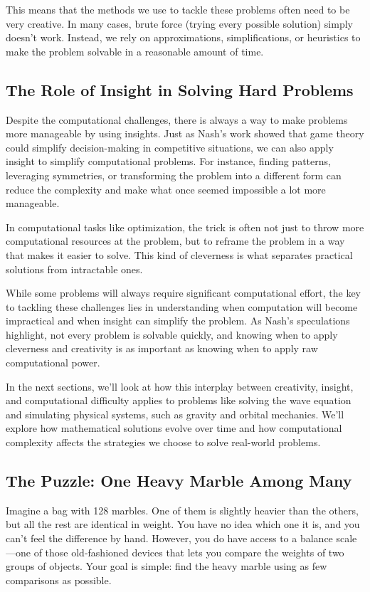 This means that the methods we use to tackle these problems often need to be very creative. In many cases, brute force (trying every possible solution) simply doesn’t work. Instead, we rely on approximations, simplifications, or heuristics to make the problem solvable in a reasonable amount of time.

\subsection{The Role of Insight in Solving Hard Problems}

Despite the computational challenges, there is always a way to make problems more manageable by using insights. Just as Nash’s work showed that game theory could simplify decision-making in competitive situations, we can also apply insight to simplify computational problems. For instance, finding patterns, leveraging symmetries, or transforming the problem into a different form can reduce the complexity and make what once seemed impossible a lot more manageable.

In computational tasks like optimization, the trick is often not just to throw more computational resources at the problem, but to reframe the problem in a way that makes it easier to solve. This kind of cleverness is what separates practical solutions from intractable ones.

While some problems will always require significant computational effort, the key to tackling these challenges lies in understanding when computation will become impractical and when insight can simplify the problem. As Nash’s speculations highlight, not every problem is solvable quickly, and knowing when to apply cleverness and creativity is as important as knowing when to apply raw computational power.

In the next sections, we’ll look at how this interplay between creativity, insight, and computational difficulty applies to problems like solving the wave equation and simulating physical systems, such as gravity and orbital mechanics. We’ll explore how mathematical solutions evolve over time and how computational complexity affects the strategies we choose to solve real-world problems.

\subsection{The Puzzle: One Heavy Marble Among Many}

Imagine a bag with 128 marbles. One of them is slightly heavier than the others, but all the rest are identical in weight. You have no idea which one it is, and you can’t feel the difference by hand. However, you do have access to a balance scale—one of those old-fashioned devices that lets you compare the weights of two groups of objects. Your goal is simple: find the heavy marble using as few comparisons as possible.

